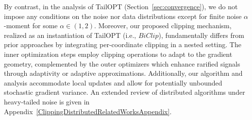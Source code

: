 By contrast, in the analysis of TailOPT (Section~\ref{sec:convergence}), we do not impose any conditions on the noise nor data distributions except for finite noise $\alpha$-moment for some $\alpha \in (1,2)$.  Moreover, our proposed clipping mechanism, realized as an instantiation of TailOPT (i.e., $BiClip$), fundamentally differs from prior approaches by integrating per-coordinate clipping in a nested setting. The inner optimization steps employ clipping operations to adapt to the gradient geometry, 
complemented by the outer optimizers which enhance rarified signals through adaptivity or adaptive approximations. Additionally, our algorithm and analysis accommodate local updates and allow for potentially unbounded stochastic gradient variance.
An extended review of distributed algorithms under heavy-tailed noise is given in Appendix~\ref{ClippingDistributedRelatedWorksAppendix}.